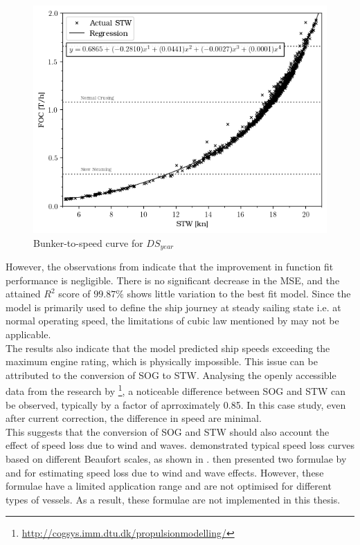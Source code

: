 \begin{figure}
    \centering
    \includegraphics[width=.7\linewidth]{02_figures/FOC_plot_act_yr.png}
    \caption{Bunker-to-speed curve for $DS_{year}$}
    \label{fig:FOC_plot_act_yr}
\end{figure}

However, the observations from  indicate that the improvement in function fit performance is negligible. There is no significant decrease in the MSE, and the attained $R^2$ score of $99.87\%$ shows little variation to the best fit model. Since the model is primarily used to define the ship journey at steady sailing state i.e. at normal operating speed, the limitations of cubic law mentioned by  may not be applicable.\\

The results also indicate that the model predicted ship speeds exceeding the maximum engine rating, which is physically impossible. This issue can be attributed to the conversion of SOG to STW. Analysing the openly accessible data from the research by \footnote{\url{http://cogsys.imm.dtu.dk/propulsionmodelling/}}, a noticeable difference between SOG and STW can be observed, typically by a factor of aprroximately 0.85. In this case study, even after current correction, the difference in speed are minimal.\\ 

This suggests that the conversion of SOG and STW should also account the effect of speed loss due to wind and waves.  demonstrated typical speed loss curves based on different Beaufort scales, as shown in .  then presented two formulae by  and  for estimating speed loss due to wind and wave effects. However, these formulae have a limited application range and are not optimised for different types of vessels. As a result, these formulae are not implemented in this thesis.\\ 

